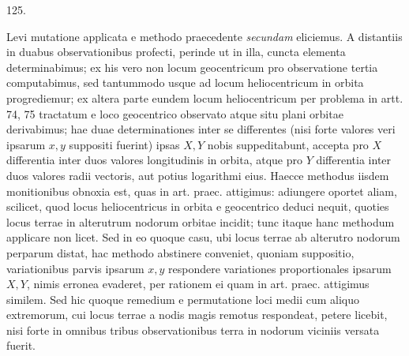\par{}\medskip
\begin{center}\hypertarget{native-172-article125}{}125.\end{center}
Levi mutatione applicata e methodo praecedente \emph{secundam} eliciemus. A
distantiis in duabus observationibus profecti, perinde ut in illa, cuncta elementa
determinabimus; ex his vero non locum geocentricum pro observatione
tertia computabimus, sed tantummodo usque ad locum heliocentricum in orbita
progrediemur; ex altera parte eundem locum heliocentricum per problema
in artt. 74, 75 tractatum e loco geocentrico observato atque situ plani orbitae
derivabimus; hae duae determinationes inter se differentes (nisi forte valores
veri ipsarum $x,y$ suppositi fuerint) ipsas $X,Y$ nobis suppeditabunt, accepta
pro $X$ differentia inter duos valores longitudinis in orbita, atque pro $Y$ differentia
inter duos valores radii vectoris, aut potius logarithmi eius. Haecce
methodus iisdem monitionibus obnoxia est, quas in art. praec. attigimus: adiungere
oportet aliam, scilicet, quod locus heliocentricus in orbita e geocentrico
deduci nequit, quoties locus terrae in alterutrum nodorum orbitae incidit;
tunc itaque hanc methodum applicare non licet. Sed in eo quoque
casu, ubi locus terrae ab alterutro nodorum perparum distat, hac methodo abstinere
conveniet, quoniam suppositio, variationibus parvis ipsarum $x,y$ respondere
variationes proportionales ipsarum $X,Y$, nimis erronea evaderet, per
rationem ei quam in art. praec. attigimus similem. Sed hic quoque remedium
e permutatione loci medii cum aliquo extremorum, cui locus terrae a nodis
magis remotus respondeat, petere licebit, nisi forte in omnibus tribus observationibus
terra in nodorum viciniis versata fuerit.
